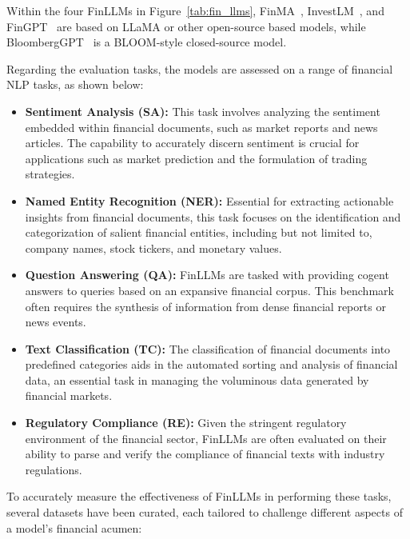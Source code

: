 Within the four FinLLMs in Figure~\ref{tab:fin_llms}, FinMA~\cite{xie2023pixiu}, InvestLM~\cite{yang2023investlm}, and FinGPT~\cite{wang2023fingpt} are based on LLaMA or other open-source based models, while BloombergGPT~\cite{wu2023bloomberggpt} is a BLOOM-style closed-source model.

Regarding the evaluation tasks, the models are assessed on a range of financial NLP tasks, as shown below:

\begin{itemize}
	\item \textbf{Sentiment Analysis (SA):} {This task involves analyzing the sentiment embedded within financial documents, such as market reports and news articles. The capability to accurately discern sentiment is crucial for applications such as market prediction and the formulation of trading strategies.}

	\item \textbf{Named Entity Recognition (NER):} {Essential for extracting actionable insights from financial documents, this task focuses on the identification and categorization of salient financial entities, including but not limited to, company names, stock tickers, and monetary values.}

	\item \textbf{Question Answering (QA):} {FinLLMs are tasked with providing cogent answers to queries based on an expansive financial corpus. This benchmark often requires the synthesis of information from dense financial reports or news events.}

	\item \textbf{Text Classification (TC):} {The classification of financial documents into predefined categories aids in the automated sorting and analysis of financial data, an essential task in managing the voluminous data generated by financial markets.}

	\item \textbf{Regulatory Compliance (RE):} {Given the stringent regulatory environment of the financial sector, FinLLMs are often evaluated on their ability to parse and verify the compliance of financial texts with industry regulations.}
\end{itemize}

To accurately measure the effectiveness of FinLLMs in performing these tasks, several datasets have been curated, each tailored to challenge different aspects of a model's financial acumen:

